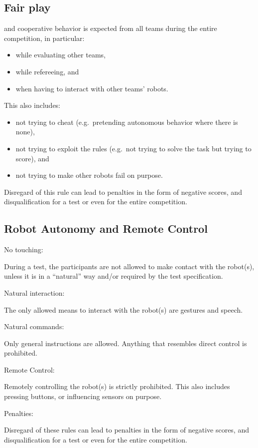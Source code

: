 \subsection{Fair play}\label{rule:fairplay}
 and cooperative behavior is expected from all teams during the entire competition, in particular:
\begin{itemize}
\item while evaluating other teams, 
\item while refereeing, and 
\item when having to interact with other teams' robots.  
\end{itemize}
This also includes:
\begin{itemize}
\item not trying to cheat (e.g.~pretending autonomous behavior where there is none), 
\item not trying to exploit the rules (e.g.~not trying to solve the task but trying to score), and 
\item not trying to make other robots fail on purpose. 
\end{itemize}
Disregard of this rule can lead to penalties in the form of negative scores, and disqualification 
for a test or even for the entire competition. 

\subsection{Robot Autonomy and Remote Control}
\begin{enumerate}
{\bf\item No touching:} During a test, the participants are not allowed to make contact with the robot(s), 
  unless it is in a ``natural'' way and/or required by the test specification. 
{\bf\item Natural interaction:} The only allowed means to interact with the robot(s) are gestures and speech.
{\bf\item Natural commands:} Only general instructions are allowed. 
Anything that resembles direct control is prohibited.
 
{\bf\item Remote Control:} Remotely controlling the robot(s) is strictly prohibited. 
This also includes pressing buttons, or influencing sensors on purpose.
{\bf\item Penalties:} Disregard of these rules can lead to penalties in the form of negative scores, and disqualification 
for a test or even for the entire competition. 
\end{enumerate}


